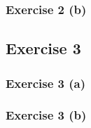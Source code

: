 \documentclass{article}
\begin{document}
\subsubsection{Exercise 2 (b)}

\subsection{Exercise 3}
\subsubsection{Exercise 3 (a)}

\subsubsection{Exercise 3 (b)}

\end{document}
